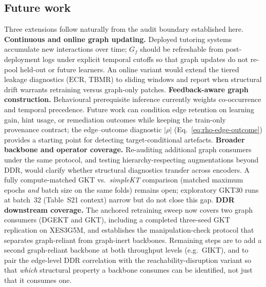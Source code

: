 \documentclass[pdflatex,sn-mathphys-num]{sn-jnl}
\newcommand{\DDR}{\textsc{DDR}}
\begin{document}
\subsection{Future work}
\label{sec:future-work}
Three extensions follow naturally from the audit boundary established here.
\textbf{Continuous and online graph updating.} Deployed tutoring systems
accumulate new interactions over time; $G_f$ should be refreshable from
post-deployment logs under explicit temporal cutoffs so that graph updates
do not re-pool held-out or future learners. An online variant would extend
the tiered leakage diagnostics ($\mathrm{ECR}$, TBMR) to sliding windows
and report when structural drift warrants retraining versus graph-only
patches.
\textbf{Feedback-aware graph construction.} Behavioural prerequisite
inference currently weights co-occurrence and temporal precedence. Future
work can condition edge retention on learning gain, hint usage, or
remediation outcomes while keeping the train-only provenance contract;
the edge--outcome diagnostic $|\rho|$ (Eq.~\eqref{eq:rho-edge-outcome})
provides a starting point for detecting target-conditional artefacts.
\textbf{Broader backbone and operator coverage.} Re-auditing additional
graph consumers under the same protocol, and testing hierarchy-respecting
augmentations beyond \DDR{}, would clarify whether structural diagnostics
transfer across encoders. A fully compute-matched GKT vs.\ \textit{simpleKT}
comparison (matched maximum epochs \emph{and} batch size on the same folds)
remains open; exploratory GKT30 runs at batch~32 (Table~S21 context) narrow
but do not close this gap.
\textbf{\DDR{} downstream coverage.} The anchored retraining sweep now covers
two graph consumers (DGEKT and GKT), including a completed three-seed GKT
replication on XES3G5M, and establishes the manipulation-check protocol that
separates graph-reliant from graph-inert backbones. Remaining steps are to add a
second graph-reliant backbone at both throughput levels (e.g.\ GIKT), and to pair
the edge-level \DDR{} correlation with the reachability-disruption variant so that
\emph{which} structural property a backbone consumes can be identified, not just
that it consumes one.

\end{document}
